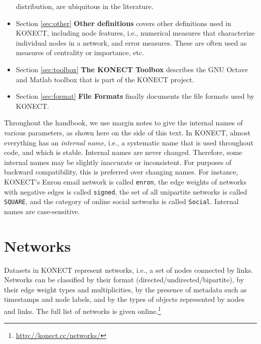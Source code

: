 \documentclass{article}
\begin{document}
\begin{itemize}
  distribution, are ubiquitous in the literature. 
\item Section \ref{sec:other} \textbf{Other definitions} covers other
  definitions used in KONECT, including node features,
  i.e., numerical measures that characterize individual nodes in a
  network, and error measures.  These are often used as measures of centrality or
  importance, etc. 
\item Section \ref{sec:toolbox} \textbf{The KONECT Toolbox} describes the GNU
  Octave and Matlab toolbox that is part of the KONECT project. 
\item Section \ref{sec:format} \textbf{File Formats} finally documents the
  file formats used by KONECT. 
\end{itemize}
Throughout the handbook, we use margin notes to give the internal 
names of various parameters, as shown here on the side of this text.  
In KONECT, almost everything has an \emph{internal name}, i.e., a
systematic name that is used throughout code, and which is stable.
Internal names are never changed.  Therefore, some internal names may be
slightly inaccurate or inconsistent.  For purposes of backward
compatibility, this is preferred over changing names.  For instance,
KONECT's Enron email network is called \texttt{enron}, the edge weights
of networks with negative edges is called \texttt{signed}, the set
of all unipartite networks is called \texttt{SQUARE}, and the category
of online social networks is called \texttt{Social}.  Internal names are
case-sensitive. 

\section{Networks}
\label{sec:taxonomy}
Datasets in KONECT represent networks, i.e., a set of nodes connected by
links. Networks can be classified by their format
(directed/undirected/bipartite), by their edge weight types and
multiplicities, by the 
presence of metadata such as timestamps and node labels, and by
the types of objects represented by nodes and links. 
The full list of networks is given
online.\footnote{\href{http://konect.cc/networks/}{http://konect.cc/networks/}}  
\end{document}
